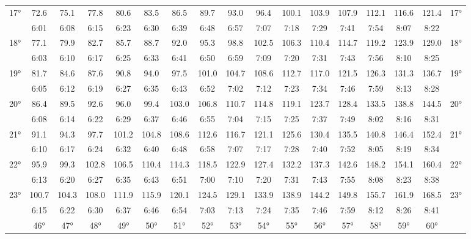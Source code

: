 \begin{footnotesize}
\begin{tabular}{c || c | c | c | c | c | c | c | c | c | c | c | c | c | c | c || c}
		\multirow{2}{*}{17°}&72.6&75.1&77.8&80.6&83.5&86.5&89.7&93.0&96.4&100.1&103.9&107.9&112.1&116.6&121.4&\multirow{2}{*}{17°}\\ \space&6:01&6:08&6:15&6:23&6:30&6:39&6:48&6:57&7:07&7:18&7:29&7:41&7:54&8:07&8:22&\space\\\hline
		\multirow{2}{*}{18°}&77.1&79.9&82.7&85.7&88.7&92.0&95.3&98.8&102.5&106.3&110.4&114.7&119.2&123.9&129.0&\multirow{2}{*}{18°}\\ \space&6:03&6:10&6:17&6:25&6:33&6:41&6:50&6:59&7:09&7:20&7:31&7:43&7:56&8:10&8:25&\space\\\hline
		\multirow{2}{*}{19°}&81.7&84.6&87.6&90.8&94.0&97.5&101.0&104.7&108.6&112.7&117.0&121.5&126.3&131.3&136.7&\multirow{2}{*}{19°}\\ \space&6:05&6:12&6:19&6:27&6:35&6:43&6:52&7:02&7:12&7:23&7:34&7:46&7:59&8:13&8:28&\space\\\hline
		\multirow{2}{*}{20°}&86.4&89.5&92.6&96.0&99.4&103.0&106.8&110.7&114.8&119.1&123.7&128.4&133.5&138.8&144.5&\multirow{2}{*}{20°}\\ \space&6:08&6:14&6:22&6:29&6:37&6:46&6:55&7:04&7:15&7:25&7:37&7:49&8:02&8:16&8:31&\space\\\hline
		\multirow{2}{*}{21°}&91.1&94.3&97.7&101.2&104.8&108.6&112.6&116.7&121.1&125.6&130.4&135.5&140.8&146.4&152.4&\multirow{2}{*}{21°}\\ \space&6:10&6:17&6:24&6:32&6:40&6:48&6:58&7:07&7:17&7:28&7:40&7:52&8:05&8:19&8:34&\space\\\hline
		\multirow{2}{*}{22°}&95.9&99.3&102.8&106.5&110.4&114.3&118.5&122.9&127.4&132.2&137.3&142.6&148.2&154.1&160.4&\multirow{2}{*}{22°}\\ \space&6:13&6:20&6:27&6:35&6:43&6:51&7:00&7:10&7:20&7:31&7:43&7:55&8:08&8:23&8:38&\space\\\hline
		\multirow{2}{*}{23°}&100.7&104.3&108.0&111.9&115.9&120.1&124.5&129.1&133.9&138.9&144.2&149.8&155.7&161.9&168.5&\multirow{2}{*}{23°}\\ \space&6:15&6:22&6:30&6:37&6:46&6:54&7:03&7:13&7:24&7:35&7:46&7:59&8:12&8:26&8:41&\space\\\hline
		\hline\space &46°&47°&48°&49°&50°&51°&52°&53°&54°&55°&56°&57°&58°&59°&60°
\end{tabular}\end{footnotesize}

